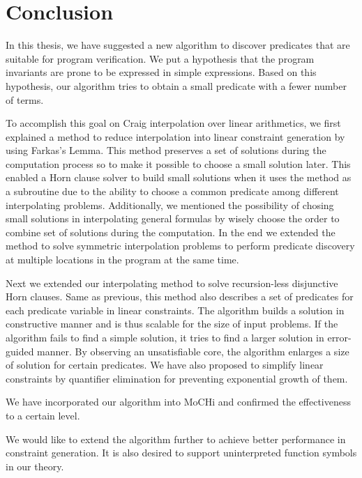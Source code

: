 \chapter{Conclusion}
\label{chap:conclusion}

In this thesis, we have suggested a new algorithm to discover
predicates that are suitable for program verification.  We put a
hypothesis that the program invariants are prone to be expressed in
simple expressions.  Based on this hypothesis, our algorithm tries to
obtain a small predicate with a fewer number of terms.

To accomplish this goal on Craig interpolation over linear
arithmetics, we first explained a method to reduce interpolation into
linear constraint generation by using Farkas's Lemma.  This method
preserves a set of solutions during the computation process so to make
it possible to choose a small solution later. This enabled a Horn
clause solver to build small solutions when it uses the method as a
subroutine due to the ability to choose a common predicate among
different interpolating problems. Additionally, we mentioned the
possibility of chosing small solutions in interpolating general
formulas by wisely choose the order to combine set of solutions during
the computation. In the end we extended the method to solve symmetric
interpolation problems to perform predicate discovery at multiple
locations in the program at the same time.

Next we extended our interpolating method to solve recursion-less
disjunctive Horn clauses.  Same as previous, this method also
describes a set of predicates for each predicate variable in linear
constraints.  The algorithm builds a solution in constructive manner
and is thus scalable for the size of input problems. If the algorithm
fails to find a simple solution, it tries to find a larger solution in
error-guided manner.  By observing an unsatisfiable core, the
algorithm enlarges a size of solution for certain predicates.  We have
also proposed to simplify linear constraints by quantifier elimination
for preventing exponential growth of them.

We have incorporated our algorithm into MoCHi and confirmed the
effectiveness to a certain level.

We would like to extend the algorithm further to achieve better
performance in constraint generation.  It is also desired to support
uninterpreted function symbols in our theory.
